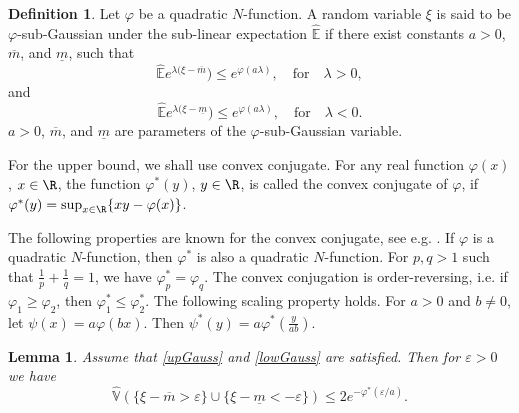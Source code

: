 \documentclass[12pt]{article}
\newtheorem{lemma}[theorem]{Lemma}
\theoremstyle{definition}
\newtheorem{definition}[theorem]{Definition}
\theoremstyle{remark}
\numberwithin{equation}{section}
\def\Eh{{\hat{\mathbb{E}}}}
\def\Vh{{\hat{\mathbb{V}}}}
\begin{document}
\begin{definition}
Let $\varphi$ be a quadratic $N$-function.
A random variable $\xi$ is said to be $\varphi$-sub-Gaussian under the sub-linear expectation $\Eh$ if there exist
constants  $a > 0$, $\overline{m}$, and $\underline{m}$, such that
\begin{equation}   \label{upGauss}
\Eh e^{\lambda(\xi - \overline{m}}) \le e^{\varphi(a\lambda)}, \quad {\text {for}} \quad \lambda>0,
\end{equation}
and 
\begin{equation}   \label{lowGauss}
\Eh e^{\lambda(\xi - \underline{m}}) \le e^{\varphi(a\lambda)}, \quad {\text {for}} \quad \lambda<0.
\end{equation}
$a > 0$, $\overline{m}$, and $\underline{m}$ are parameters of the $\varphi$-sub-Gaussian variable.
\end{definition}

For the upper bound, we shall use convex conjugate.
For any real function $\varphi(x)$, $x \in \R$, 
the function $\varphi^*(y)$, $y \in \R$, is called the convex conjugate of $\varphi$, if
$\varphi^*(y) = \sup_{x \in \R} \{ xy - \varphi(x) \}$.

The following properties are known for the convex conjugate, see e.g. \cite{Zajkowski2020}.
If $\varphi$ is a quadratic $N$-function, then $\varphi^*$ is also a quadratic $N$-function.
For $p, q > 1$ such that $\frac{1}{p} + \frac{1}{q} = 1$, we have
$\varphi_p^* = \varphi_q$.
%
The convex conjugation is order-reversing, i.e.  if $\varphi_1 \ge \varphi_2$, then $\varphi_1^* \le \varphi_2^*$.
The following scaling property holds.
For $a > 0$ and $b \ne 0$, let $\psi(x) = a \varphi(bx)$.
Then
$\psi^*(y) = a \varphi^*\left( \frac{y}{ab} \right)$.


\begin{lemma} \label{mainLemma}
Assume that \eqref{upGauss} and \eqref{lowGauss} are satisfied.
Then for $\varepsilon>0$ we have
\begin{equation}
\Vh\left( \{ \xi-\overline{m} > \varepsilon \} \cup \{ \xi-\underline{m} < -\varepsilon \} \right)  
\le 2 e^{-\varphi^*\left(\varepsilon/a\right)}.
\end{equation}

\end{lemma}
\end{document}
